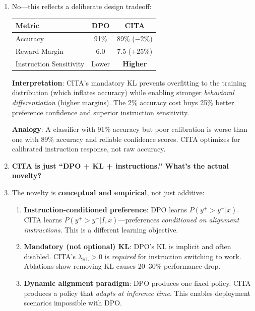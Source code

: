 \begin{enumerate}[label=\textbf{Q\arabic*.}, leftmargin=*, itemsep=8pt]
\item[\ding{224}] No---this reflects a deliberate design tradeoff:

\begin{table}[H]
\centering
\small
\begin{tabular}{@{}lcc@{}}
\toprule
\textbf{Metric} & \textbf{DPO} & \textbf{CITA} \\
\midrule
Accuracy & 91\% & 89\% ($-$2\%) \\
\hline
Reward Margin & 6.0 & 7.5 (+25\%) \\
\hline
Instruction Sensitivity & Lower & \textbf{Higher} \\
\bottomrule
\end{tabular}
\end{table}

\textbf{Interpretation}: CITA's mandatory KL prevents overfitting to the training distribution (which inflates accuracy) while enabling stronger \textit{behavioral differentiation} (higher margins). The 2\% accuracy cost buys 25\% better preference confidence and superior instruction sensitivity.

\textbf{Analogy}: A classifier with 91\% accuracy but poor calibration is worse than one with 89\% accuracy and reliable confidence scores. CITA optimizes for calibrated instruction response, not raw accuracy.

\vspace{4mm}

\item[\ding{93}] \textbf{CITA is just ``DPO + KL + instructions.'' What's the actual novelty?}

\item[\ding{224}] The novelty is \textbf{conceptual and empirical}, not just additive:

\begin{enumerate}[leftmargin=*,itemsep=2pt]
    \item \textbf{Instruction-conditioned preference}: DPO learns $P(y^+ > y^- | x)$. CITA learns $P(y^+ > y^- | I, x)$---preferences \textit{conditioned on alignment instructions}. This is a different learning objective.

    \item \textbf{Mandatory (not optional) KL}: DPO's KL is implicit and often disabled. CITA's $\lambda_{\text{KL}} > 0$ is \textit{required} for instruction switching to work. Ablations show removing KL causes 20--30\% performance drop.

    \item \textbf{Dynamic alignment paradigm}: DPO produces one fixed policy. CITA produces a policy that \textit{adapts at inference time}. This enables deployment scenarios impossible with DPO.


\end{enumerate}
\end{enumerate}
